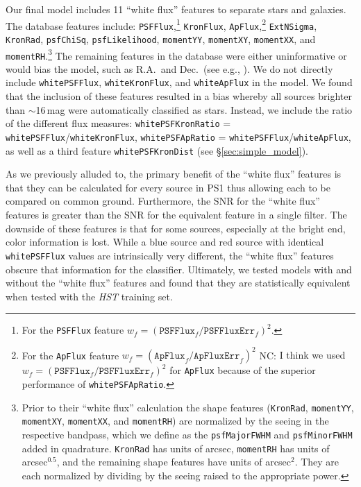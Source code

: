 \documentclass[twocolumn, dvipdfmx]{aastex62}
\newcommand{\NC}[1]{{\color{brown} NC: {#1}}}
\begin{document}
Our final model includes 11 ``white flux'' features to separate stars and
galaxies. The database features include: \texttt{PSFFlux},\footnote{For the
\texttt{PSFFlux} feature $w_f =
(\mathtt{PSFFlux}_f/\mathtt{PSFFluxErr}_f)^2$.} \texttt{KronFlux},
\texttt{ApFlux},\footnote{For the \texttt{ApFlux} feature $w_f =
(\mathtt{ApFlux}_f/\mathtt{ApFluxErr}_f)^2$ 
\NC{I think we used $w_f =
(\mathtt{PSFFlux}_f/\mathtt{PSFFluxErr}_f)^2$ for \texttt{ApFlux} 
because of the superior performance of \texttt{whitePSFApRatio}}. 
} \texttt{ExtNSigma},
\texttt{KronRad}, \texttt{psfChiSq}, \texttt{psfLikelihood},
\texttt{momentYY}, \texttt{momentXY}, \texttt{momentXX}, and
\texttt{momentRH}.\footnote{Prior to their ``white flux'' calculation the
shape features (\texttt{KronRad}, \texttt{momentYY}, \texttt{momentXY},
\texttt{momentXX}, and \texttt{momentRH}) are normalized by the seeing in the
respective bandpass, which we define as the \texttt{psfMajorFWHM} and
\texttt{psfMinorFWHM} added in quadrature. \texttt{KronRad} has units of
arcsec, \texttt{momentRH} has units of arcsec$^{0.5}$, and the remaining
shape features have units of arcsec$^{2}$. They are each normalized by
dividing by the seeing raised to the appropriate power. } The remaining
features in the database were either uninformative or would bias the model,
such as R.A.\ and Dec.\ (see e.g., \citealt{Richards12a}). We do not directly
include \texttt{whitePSFFlux}, \texttt{whiteKronFlux}, and
\texttt{whiteApFlux} in the model. We found that the inclusion of these
features resulted in a bias whereby all sources brighter than $\sim$16\,mag
were automatically classified as stars. Instead, we include the ratio of the
different flux measures: \texttt{whitePSFKronRatio} =
\texttt{whitePSFFlux}/\texttt{whiteKronFlux}, \texttt{whitePSFApRatio} =
\texttt{whitePSFFlux}/\texttt{whiteApFlux}, as well as a third feature
\texttt{whitePSFKronDist} (see \S\ref{sec:simple_model}).

As we previously alluded to, the primary benefit of the ``white flux''
features is that they can be calculated for every source in PS1 thus allowing
each to be compared on common ground. Furthermore, the SNR for the ``white
flux'' features is greater than the SNR for the equivalent feature in a
single filter. The downside of these features is that for some sources,
especially at the bright end, color information is lost. While a blue source
and red source with identical \texttt{whitePSFFlux} values are intrinsically
very different, the ``white flux'' features obscure that information for the
classifier. Ultimately, we tested models with and without the ``white flux''
features and found that they are statistically equivalent when tested with
the \textit{HST} training set.
\end{document}
